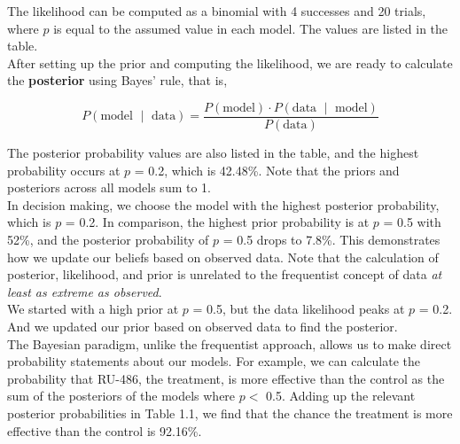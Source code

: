 The likelihood can be computed as a binomial with 4 successes and 20 trials, where $p$ is equal to the assumed value in each model. The values are listed in the table.\\

After setting up the prior and computing the likelihood, we are ready to calculate the \textbf{posterior} using Bayes’ rule, that is,

\[
P(\text{model $\mid$ data}) = \frac{P(\text{model}) \cdot P(\text{data $\mid$ model})}{P(\text{data})}
\]

The posterior probability values are also listed in the table, and the highest probability occurs at $p$ = 0.2, which is 42.48\%. Note that the priors and posteriors across all models sum to 1.\\

In decision making, we choose the model with the highest posterior probability, which is $p$ = 0.2. In comparison, the highest prior probability is at $p$ = 0.5 with 52\%, and the posterior probability of $p$ = 0.5 drops to 7.8\%. This demonstrates how we update our beliefs based on observed data. Note that the calculation of posterior, likelihood, and prior is unrelated to the frequentist concept of data \textit{at least as extreme as observed}.\\

We started with a high prior at $p$ = 0.5, but the data likelihood peaks at $p$ = 0.2. And we updated our prior based on observed data to find the posterior.\\

The Bayesian paradigm, unlike the frequentist approach, allows us to make direct probability statements about our models. For example, we can calculate the probability that RU-486, the treatment, is more effective than the control as the sum of the posteriors of the models where $p <$ 0.5. Adding up the relevant posterior probabilities in Table 1.1, we find that the chance the treatment is more effective than the control is 92.16\%.\\

